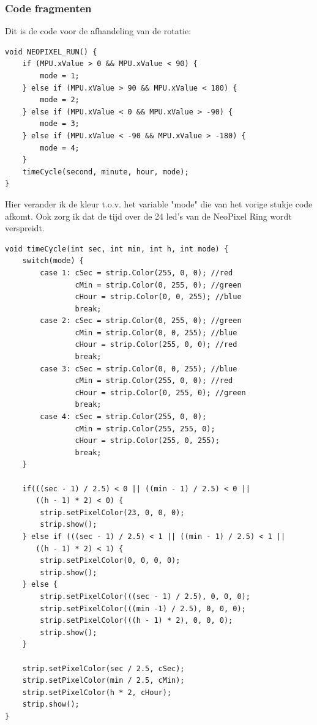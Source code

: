 \documentclass[a4paper,12pt]{article}
\begin{document}
\subsubsection{Code fragmenten}
Dit is de code voor de afhandeling van de rotatie:
\begin{lstlisting}[caption=NEOPIXEL.cpp]
void NEOPIXEL_RUN() {
    if (MPU.xValue > 0 && MPU.xValue < 90) {
        mode = 1;
    } else if (MPU.xValue > 90 && MPU.xValue < 180) {
        mode = 2;
    } else if (MPU.xValue < 0 && MPU.xValue > -90) {
        mode = 3;
    } else if (MPU.xValue < -90 && MPU.xValue > -180) {
        mode = 4;
    }
    timeCycle(second, minute, hour, mode);
}
\end{lstlisting} 
Hier verander ik de kleur t.o.v. het variable "mode" die van het vorige stukje code afkomt.
Ook zorg ik dat de tijd over de 24 led's van de NeoPixel Ring wordt verspreidt.
\begin{lstlisting}[caption=NEOPIXEL.cpp]
void timeCycle(int sec, int min, int h, int mode) {
    switch(mode) {
        case 1: cSec = strip.Color(255, 0, 0); //red
                cMin = strip.Color(0, 255, 0); //green
                cHour = strip.Color(0, 0, 255); //blue
                break;
        case 2: cSec = strip.Color(0, 255, 0); //green
                cMin = strip.Color(0, 0, 255); //blue
                cHour = strip.Color(255, 0, 0); //red
                break;
        case 3: cSec = strip.Color(0, 0, 255); //blue
                cMin = strip.Color(255, 0, 0); //red
                cHour = strip.Color(0, 255, 0); //green
                break;
        case 4: cSec = strip.Color(255, 0, 0); 
                cMin = strip.Color(255, 255, 0); 
                cHour = strip.Color(255, 0, 255);
                break;                       
    }
      
    if(((sec - 1) / 2.5) < 0 || ((min - 1) / 2.5) < 0 ||
       ((h - 1) * 2) < 0) {
        strip.setPixelColor(23, 0, 0, 0);
        strip.show();
    } else if (((sec - 1) / 2.5) < 1 || ((min - 1) / 2.5) < 1 ||
       ((h - 1) * 2) < 1) {
        strip.setPixelColor(0, 0, 0, 0);
        strip.show();
    } else {
        strip.setPixelColor(((sec - 1) / 2.5), 0, 0, 0);
        strip.setPixelColor(((min -1) / 2.5), 0, 0, 0);
        strip.setPixelColor(((h - 1) * 2), 0, 0, 0);
        strip.show();
    }
      
    strip.setPixelColor(sec / 2.5, cSec);
    strip.setPixelColor(min / 2.5, cMin);
    strip.setPixelColor(h * 2, cHour);
    strip.show();
}
\end{lstlisting}
\end{document}
